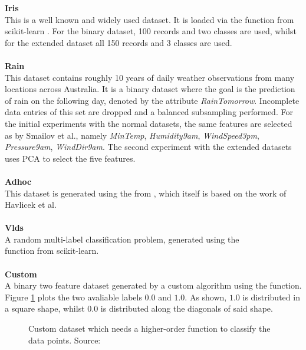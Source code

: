 \textbf{Iris}\\ 
This is a well known and widely used dataset. It is loaded via the  function from scikit-learn \cite{SklearnDatasetsLoad}. For the binary dataset, 100 records and two classes are used, whilst for the extended dataset all 150 records and 3 classes are used.
\\
\\
\textbf{Rain}\\
This dataset contains roughly 10 years of daily weather observations from many locations across Australia. It is a binary dataset where the goal is the prediction of rain on the following day, denoted by the attribute \textit{RainTomorrow}. Incomplete data entries of this set are dropped and a balanced subsampling performed. For the initial experiments with the normal datasets, the same features are selected as by Smailov et al., namely \textit{MinTemp}, \textit{Humidity9am}, \textit{WindSpeed3pm}, \textit{Pressure9am}, \textit{WindDir9am}. The second experiment with the extended datasets uses PCA to select the five features.
\\
\\
\textbf{Adhoc}\\
This dataset is generated using the  from \cite{AdHocData}, which itself is based on the work of Havlicek et al.\cite{havlicekSupervisedLearningQuantum2019}
\\
\\
\textbf{Vlds}\\
A random multi-label classification problem, generated using the\\  function from scikit-learn\cite{scikit-learn}.
\\
\\
\textbf{Custom}\\
A binary two feature dataset generated by a custom algorithm using the  function. Figure \ref{figure:custom_dataset} plots the two avaliable labels $0.0$ and $1.0$. As shown, $1.0$ is distributed in a square shape, whilst $0.0$ is distributed along the diagonals of said shape.

\begin{figure}[!ht]
    \centering
    \caption{Custom dataset which needs a higher-order function to classify the data points. Source: \cite{smailovQuantumMachineLearning2021}}
    \label{figure:custom_dataset}
\end{figure}

